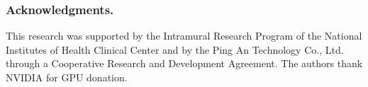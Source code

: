 \documentclass[runningheads,a4paper]{llncs}
\begin{document}
\vspace{-1mm}
\subsubsection*{Acknowledgments.} This research was supported by the Intramural Research Program of the National Institutes of Health Clinical Center and by the Ping An Technology Co., Ltd. through a Cooperative Research and Development Agreement. The authors thank NVIDIA for GPU donation.



\end{document}
